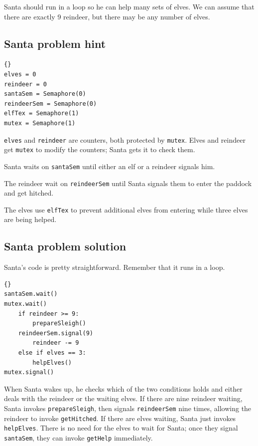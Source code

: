 \documentclass{book}
\newcommand{\clearemptydoublepage}{\newpage\cleardoublepage}
\begin{document}
Santa should run in a loop so he can help many sets of elves.
We can assume that there are exactly 9 reindeer, but there may
be any number of elves.  

\clearemptydoublepage
\subsection {Santa problem hint}

\begin{lstlisting}[title={Santa problem hint}]{}
elves = 0
reindeer = 0
santaSem = Semaphore(0)
reindeerSem = Semaphore(0)
elfTex = Semaphore(1)
mutex = Semaphore(1)
\end{lstlisting}

{\tt elves} and {\tt reindeer} are counters, both protected
by {\tt mutex}.  Elves and reindeer get {\tt mutex} to modify the
counters; Santa gets it to check them.

Santa waits on {\tt santaSem} until either an elf or a reindeer
signals him.

The reindeer wait on {\tt reindeerSem} until Santa signals them to
enter the paddock and get hitched.

The elves use {\tt elfTex} to prevent additional elves from
entering while three elves are being helped.


\clearemptydoublepage
\subsection {Santa problem solution}

Santa's code is pretty straightforward.  Remember that it
runs in a loop.

\begin{lstlisting}[title={Santa problem solution (Santa)}]{}
santaSem.wait()
mutex.wait()
    if reindeer >= 9:
        prepareSleigh()
	reindeerSem.signal(9)
        reindeer -= 9
    else if elves == 3:
        helpElves()
mutex.signal()
\end{lstlisting}

When Santa wakes up, he checks which of the two conditions
holds and either deals with the reindeer or the waiting elves.
If there are nine reindeer waiting,
Santa invokes {\tt prepareSleigh}, then signals {\tt reindeerSem}
nine times, allowing the reindeer to invoke {\tt getHitched}.
If there are elves waiting, Santa just
invokes {\tt helpElves}.  There is no need for the elves to wait
for Santa; once they signal {\tt santaSem}, they can
invoke {\tt getHelp} immediately.
\end{document}

